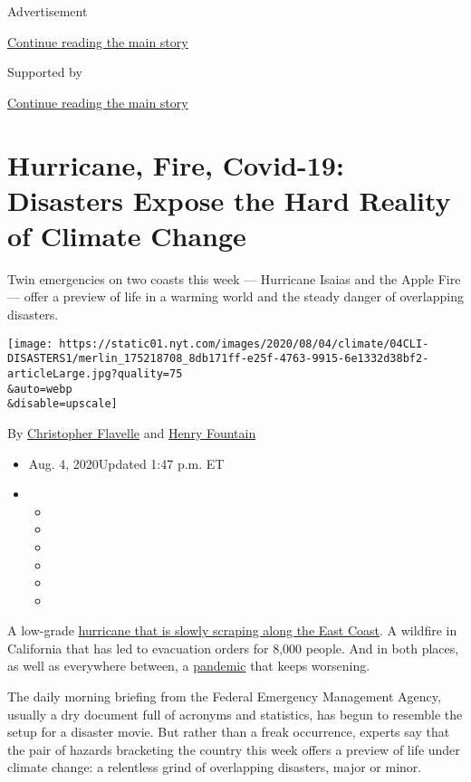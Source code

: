 Advertisement

\protect\hyperlink{after-top}{Continue reading the main story}

Supported by

\protect\hyperlink{after-sponsor}{Continue reading the main story}

\hypertarget{hurricane-fire-covid-19-disasters-expose-the-hard-reality-of-climate-change}{%
\section{Hurricane, Fire, Covid-19: Disasters Expose the Hard Reality of
Climate
Change}\label{hurricane-fire-covid-19-disasters-expose-the-hard-reality-of-climate-change}}

Twin emergencies on two coasts this week --- Hurricane Isaias and the
Apple Fire --- offer a preview of life in a warming world and the steady
danger of overlapping disasters.

\texttt{[image: https://static01.nyt.com/images/2020/08/04/climate/04CLI-DISASTERS1/merlin\_175218708\_8db171ff-e25f-4763-9915-6e1332d38bf2-articleLarge.jpg?quality=75\\\&auto=webp\\\&disable=upscale]}

By \href{https://www.nytimes.com/by/christopher-flavelle}{Christopher
Flavelle} and \href{https://www.nytimes.com/by/henry-fountain}{Henry
Fountain}

\begin{itemize}
\item
  Aug. 4, 2020Updated 1:47 p.m. ET
\item
  \begin{itemize}
  \item
  \item
  \item
  \item
  \item
  \item
  \end{itemize}
\end{itemize}

A low-grade
\href{https://www.nytimes.com/2020/08/04/us/isaias-storm-updates.html}{hurricane
that is slowly scraping along the East Coast}. A wildfire in California
that has led to evacuation orders for 8,000 people. And in both places,
as well as everywhere between, a
\href{https://www.nytimes.com/interactive/2020/world/coronavirus-maps.html}{pandemic}
that keeps worsening.

The daily morning briefing from the Federal Emergency Management Agency,
usually a dry document full of acronyms and statistics, has begun to
resemble the setup for a disaster movie. But rather than a freak
occurrence, experts say that the pair of hazards bracketing the country
this week offers a preview of life under climate change: a relentless
grind of overlapping disasters, major or minor.

